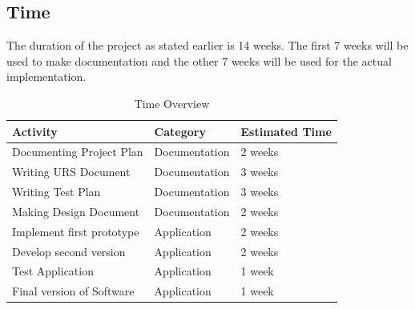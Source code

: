 \documentclass[a4paper,11pt]{article}
\begin{document}
      	\subsection{Time}
      	The duration of the project as stated earlier is 14 weeks. The first 7 weeks will be used to make documentation and the other 7 weeks will be used for the actual implementation. 
      		\begin{table}[h!]
      			\centering
      			\caption{Time Overview}
      			\label{tab:table3}
      			\begin{tabularx}{\textwidth}{ |X|X|X|}
      				\hline
      				\textbf{Activity} & \textbf{
      				Category
      				}&  \textbf{
      			Estimated Time
      			}
      \\
      \hline
      Documenting Project Plan&Documentation& 2 weeks
      \\
      \hline
      Writing URS Document& Documentation& 3 weeks
      \\
      \hline
        Writing Test Plan& Documentation& 3 weeks
        \\
        \hline
    Making Design Document& Documentation& 2 weeks
     \\
     \hline
      Implement first prototype& Application& 2 weeks
       \\
       \hline
         Develop second version& Application & 2 weeks
         \\
         \hline
           Test Application& Application& 1 week
           \\
           \hline
            Final version of Software& Application& 1 week
             \\
             \hline
            
              
              
      
    \end{tabularx}
\end{table}
\end{document}

